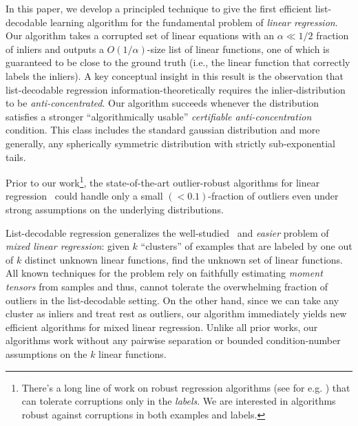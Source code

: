 In this paper, we develop a principled technique to give the first efficient list-decodable learning algorithm for the fundamental problem of \emph{linear regression}. Our algorithm takes a corrupted set of linear equations with an $\alpha \ll 1/2$ fraction of inliers and outputs a $O(1/\alpha)$-size list of linear functions, one of which is guaranteed to be close to the ground truth (i.e., the linear function that correctly labels the inliers). A key conceptual insight in this result  is the observation that list-decodable regression information-theoretically requires the inlier-distribution to be \emph{anti-concentrated}. Our algorithm succeeds whenever the distribution satisfies a stronger ``algorithmically usable'' \emph{certifiable anti-concentration} condition. This class includes the standard gaussian distribution and more generally, any spherically symmetric distribution with strictly sub-exponential tails.

Prior to our work\footnote{There's a long line of work on robust regression algorithms (see for e.g. \cite{DBLP:conf/nips/Bhatia0KK17,conf/soda/KarmalkarP19}) that can tolerate corruptions only in the \emph{labels}. We are interested in algorithms robust against corruptions in both examples and labels.}, the state-of-the-art outlier-robust algorithms for linear regression~\cite{DBLP:conf/colt/KlivansKM18,conf/soda/DiakonikolasKS19,journals/corr/abs-1803-02815,journals/corr/abs-1802-06485} could handle only a small $(<0.1)$-fraction of outliers even under strong assumptions on the underlying distributions. 

List-decodable regression generalizes the well-studied~\cite{MR1028403,doi:10.1162/neco.1994.6.2.181,MR2757044,2013arXiv1310.3745Y,DBLP:journals/corr/BalakrishnanWY14,DBLP:conf/colt/ChenYC14,DBLP:conf/nips/Zhong0D16,DBLP:conf/aistats/SedghiJA16,DBLP:conf/colt/LiL18} and {\em easier} problem of \emph{mixed linear regression}: given $k$ ``clusters'' of examples that are labeled by one out of $k$ distinct unknown linear functions, find the unknown set of linear functions. All known techniques for the problem rely on faithfully estimating \emph{moment tensors} from samples and thus, cannot tolerate the overwhelming fraction of outliers in the list-decodable setting. On the other hand, since we can take any cluster as inliers and treat rest as outliers, our algorithm immediately yields new efficient algorithms for mixed linear regression. Unlike all prior works, our algorithms work without any pairwise separation or bounded condition-number assumptions on the $k$ linear functions. 








